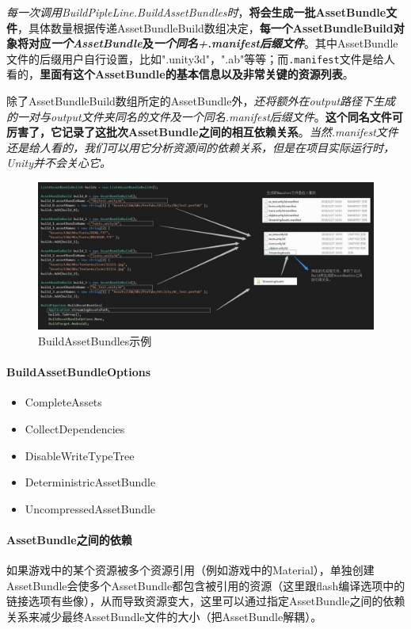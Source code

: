 \documentclass[UTF8,a4paper,12pt]{ctexbook}
\begin{document}
				\textit{每一次调用BuildPipleLine.BuildAssetBundles时}，\textbf{将会生成一批AssetBundle文件}，具体数量根据传递AssetBundleBuild数组决定，\textbf{每一个AssetBundleBuild对象将对应\textit{一个AssetBundle}及\textit{一个同名+.manifest后缀文件}}。其中AssetBundle文件的后缀用户自行设置，比如".unity3d"，".ab"等等；而\verb|.manifest|文件是给人看的，\textbf{里面有这个AssetBundle的基本信息以及非常关键的资源列表}。
				
				除了AssetBundleBuild数组所定的AssetBundle外，\textit{还将额外在output路径下生成的一对与output文件夹同名的文件及一个同名.manifest后缀文件}。\textbf{这个同名文件可厉害了，它记录了这批次AssetBundle之间的相互依赖关系}。\textit{当然.manifest文件还是给人看的，我们可以用它分析资源间的依赖关系，但是在项目实际运行时，Unity并不会关心它。}
				
					\begin{figure}[H]
						\centering
						\includegraphics[scale=0.54]{AssetBuild}
						\caption{BuildAssetBundles示例}
					\end{figure}
					
				\paragraph{BuildAssetBundleOptions}
					\begin{itemize}
						\item CompleteAssets
						\item CollectDependencies
						\item DisableWriteTypeTree
						\item DeterministricAssetBundle
						\item UncompressedAssetBundle
					\end{itemize}
	
				\paragraph{AssetBundle之间的依赖}	
					如果游戏中的某个资源被多个资源引用（例如游戏中的Material），单独创建AssetBundle会使多个AssetBundle都包含被引用的资源（这里跟flash编译选项中的链接选项有些像），从而导致资源变大，这里可以通过指定AssetBundle之间的依赖关系来减少最终AssetBundle文件的大小（把AssetBundle解耦）。
					
\end{document}

